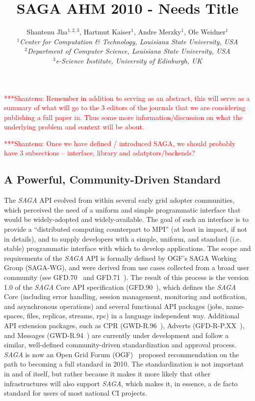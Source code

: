 \documentclass[a4paper,10pt]{article}
\newcommand{\sagaspec}{\textit{SAGA}\xspace}
\newcommand{\spec}{\sagaspec}
\newcommand{\jhanote}[1]{  {\textcolor{red}     { ***Shantenu: #1 }}}
\newcommand{\jhanote}[1]{}
\begin{document}
 \title{  \vspace{-3.5em}	SAGA AHM 2010 - Needs Title}
 
 \author{Shantenu Jha$^{1,2,3}$, Hartmut Kaiser$^{1}$, Andre Merzky$^{1}$, Ole Weidner$^{1}$ \\
   \small{\emph{$^{1}$Center for Computation \& Technology, Louisiana State University, USA}}\\
   \small{\emph{$^{2}$Department of Computer Science, Louisiana State University, USA}}\\
   \small{\emph{$^{3}$e-Science Institute, University of Edinburgh, UK}}
 }
 \date{}
 \maketitle
 

 \jhanote{Remember in addition to serving as an abstract, this will
   serve as a summary of what will go to the 3 editors of the journals
   that we are considering publishing a full paper in. Thus some more
   information/discussion on what the underlying problem and context
   will be about.}


 \jhanote{Once we have defined / introduced SAGA, we should probably
   have 3 subsections -- interface, library and adatptors/backends?}

\subsection*{A Powerful, Community-Driven Standard}

 The \spec API evolved from within several early grid adopter
 communities, which perceived the need of a uniform and simple
 programmatic interface that would be widely-adopted and
 widely-available.  The goal of such an interface is to provide a
 ``distributed computing counterpart to MPI'' (at least in impact, if
 not in details), and to supply developers with a simple, uniform, and
 standard (i.e. stable) programmatic interface with which to develop
 applications.  The scope and requirements of the \spec API is
 formally defined by OGF's SAGA Working Group (SAGA-WG), and were
 derived from use cases collected from a broad user community (see
 GFD.70~\cite{ogf-gfd-70} and GFD.71~\cite{ogf-gfd-71}).  The result
 of this process is the version 1.0 of the \spec Core API
 specification (GFD.90~\cite{ogf-gfd-90}), which defines the \spec
 Core (including error handling, session management, monitoring and
 notfication, and asynchronous operations) and several functional API
 packages (jobs, name-spaces, files, replicas, streams, rpc) in a
 language independent way.  Additional API extension packages, such as
 CPR (GWD-R.96~\cite{ogf-gwd-r-96}), Adverts
 (GFD-R-P.XX~\cite{ogf-gwd-r-p-xx}), and Messages
 (GWD-R.94~\cite{ogf-gwd-r-94}) are currently under development and
 follow a similar, well-defined community-driven standardization and
 approval process. \spec is now an Open Grid Forum (OGF)~\cite{ogf}
 proposed recommendation on the path to becoming a full standard in
 2010.  The standardization is not important in and of itself, but
 rather because it makes it more likely that other infrastructures
 will also support \spec, which makes it, in essence, a de facto
 standard for users of most national CI projects.
\end{document}
